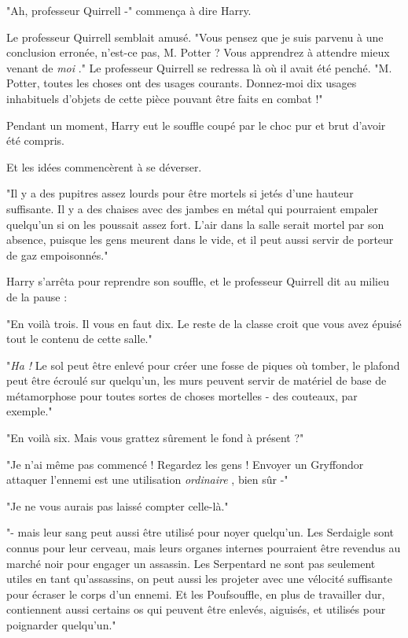 "Ah, professeur Quirrell -" commença à dire Harry.

Le professeur Quirrell semblait amusé. "Vous pensez que je suis parvenu à une conclusion erronée, n'est-ce pas, M. Potter ? Vous apprendrez à attendre mieux venant de \emph{moi} ." Le professeur Quirrell se redressa là où il avait été penché. "M. Potter, toutes les choses ont des usages courants. Donnez-moi dix usages inhabituels d'objets de cette pièce pouvant être faits en combat !"

Pendant un moment, Harry eut le souffle coupé par le choc pur et brut d'avoir été compris.

Et les idées commencèrent à se déverser.

"Il y a des pupitres assez lourds pour être mortels si jetés d'une hauteur suffisante. Il y a des chaises avec des jambes en métal qui pourraient empaler quelqu'un si on les poussait assez fort. L'air dans la salle serait mortel par son absence, puisque les gens meurent dans le vide, et il peut aussi servir de porteur de gaz empoisonnés."

Harry s'arrêta pour reprendre son souffle, et le professeur Quirrell dit au milieu de la pause :

"En voilà trois. Il vous en faut dix. Le reste de la classe croit que vous avez épuisé tout le contenu de cette salle."

"\emph{Ha !}  Le sol peut être enlevé pour créer une fosse de piques où tomber, le plafond peut être écroulé sur quelqu'un, les murs peuvent servir de matériel de base de métamorphose pour toutes sortes de choses mortelles - des couteaux, par exemple."

"En voilà six. Mais vous grattez sûrement le fond à présent ?"

"Je n'ai même pas commencé ! Regardez les gens ! Envoyer un Gryffondor attaquer l'ennemi est une utilisation \emph{ordinaire} , bien sûr -"

"Je ne vous aurais pas laissé compter celle-là."

"- mais leur sang peut aussi être utilisé pour noyer quelqu'un. Les Serdaigle sont connus pour leur cerveau, mais leurs organes internes pourraient être revendus au marché noir pour engager un assassin. Les Serpentard ne sont pas seulement utiles en tant qu'assassins, on peut aussi les projeter avec une vélocité suffisante pour écraser le corps d'un ennemi. Et les Poufsouffle, en plus de travailler dur, contiennent aussi certains os qui peuvent être enlevés, aiguisés, et utilisés pour poignarder quelqu'un."

